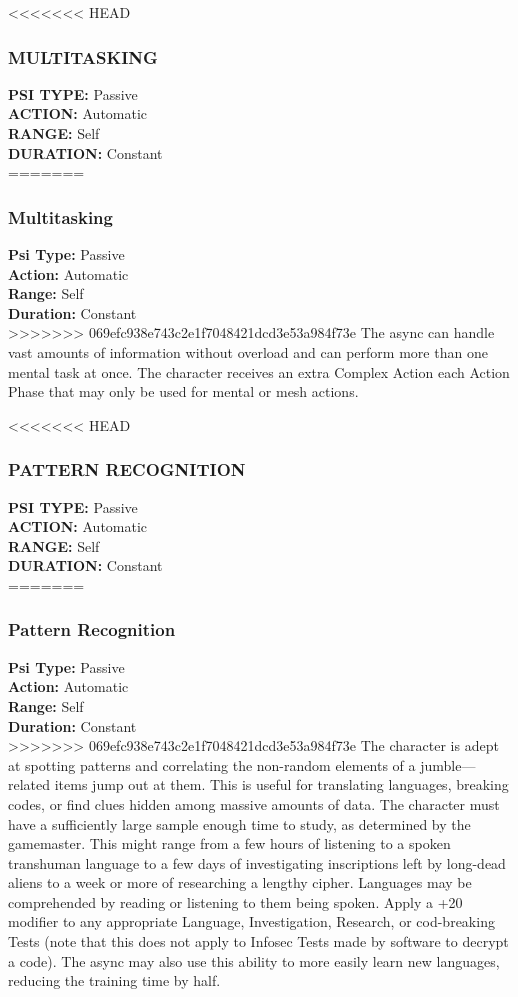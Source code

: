 <<<<<<< HEAD \subsubsection{MULTITASKING} \textbf{PSI TYPE:} Passive \\ \textbf{ACTION:} Automatic \\ \textbf{RANGE:} Self \\ \textbf{DURATION:} Constant \\ ======= \subsubsection{Multitasking} \textbf{Psi Type:} Passive \\ \textbf{Action:} Automatic \\ \textbf{Range:} Self \\ \textbf{Duration:} Constant \\ >>>>>>> 069efc938e743c2e1f7048421dcd3e53a984f73e The async can handle vast amounts of information without overload and can perform more than one mental task at once. The character receives an extra Complex Action each Action Phase that may only be used for mental or mesh actions. 

<<<<<<< HEAD \subsubsection{PATTERN RECOGNITION} \textbf{PSI TYPE:} Passive \\ \textbf{ACTION:} Automatic \\ \textbf{RANGE:} Self \\ \textbf{DURATION:} Constant \\ ======= \subsubsection{Pattern Recognition} \textbf{Psi Type:} Passive \\ \textbf{Action:} Automatic \\ \textbf{Range:} Self \\ \textbf{Duration:} Constant \\ >>>>>>> 069efc938e743c2e1f7048421dcd3e53a984f73e The character is adept at spotting patterns and correlating the non-random elements of a jumble—related items jump out at them. This is useful for translating languages, breaking codes, or find clues hidden among massive amounts of data. The character must have a sufficiently large sample enough time to study, as determined by the gamemaster. This might range from a few hours of listening to a spoken transhuman language to a few days of investigating inscriptions left by long-dead aliens to a week or more of researching a lengthy cipher. Languages may be comprehended by reading or listening to them being spoken. Apply a +20 modifier to any appropriate Language, Investigation, Research, or cod-breaking Tests (note that this does not apply to Infosec Tests made by software to decrypt a code). The async may also use this ability to more easily learn new languages, reducing the training time by half. 

